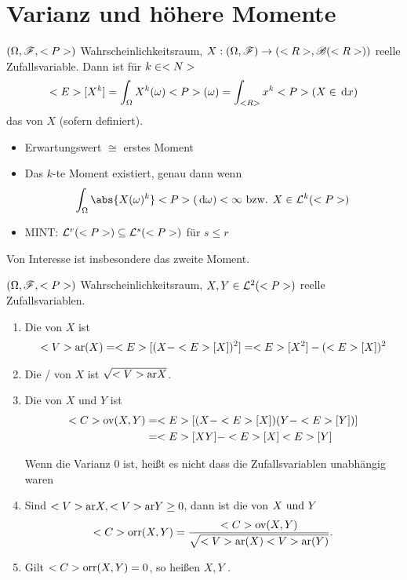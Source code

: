 \section{Varianz und höhere Momente}
\begin{definition}[$k$-te Momente]
	$(\Omega,\mathscr F,<P>)$ Wahrscheinlichkeitsraum, $X: (\Omega,\mathscr F) \to (<R>, \mathscr{B}(<R>))$ reelle Zufallsvariable. Dann ist für $k \in <N>$
	\begin{align*}
		<E>[X^k] = \int_{\Omega} X^k(\omega)<P>(\omega) = \int_{<R>}x^k <P>(X \in \,\mathrm{d} x)
	\end{align*}
	das  von $X$ (sofern definiert).
\end{definition}
\begin{*remark}
	\begin{itemize}
		\item Erwartungswert $\cong$ erstes Moment
		\item Das $k$-te Moment existiert, genau dann wenn
		\begin{align*}
			\int_{\O} \abs{X(\omega)^k}\P(\d \omega) < \infty \bzw X \in \Ln{k}(\P)
		\end{align*}
		\item MINT: $\mathcal{L}^{r}(<P>) \subseteq \mathcal{L}^{s}(<P>)$ für $s \le r$
	\end{itemize}
\end{*remark}
Von Interesse ist insbesondere das zweite Moment.
\begin{definition}
	$(\Omega,\mathscr F,<P>)$ Wahrscheinlichkeitsraum, $X,Y \in \mathcal{L}^{2}(<P>)$ reelle Zufallsvariablen.
	\begin{enumerate}
		\item Die  von $X$ ist
		\begin{align*}
			<V>\text{ar} (X) = <E>[(X - <E>[X])^2] = <E>[X^2] - (<E>[X])^2
		\end{align*}
		\item Die / von $X$ ist $\sqrt{<V>\text{ar} X}$.
		\item Die  von $X$ und $Y$ ist
		\begin{align*}
			<C>\text{ov}(X,Y) &= <E>[(X-<E>[X])(Y-<E>[Y])]\\
			&= <E>[XY] - <E>[X]<E>[Y]
		\end{align*}
		\begin{*hint}
			Wenn die Varianz 0 ist, heißt es nicht dass die Zufallsvariablen unabhängig waren
		\end{*hint}
		\item Sind $<V>\text{ar} X, <V>\text{ar} Y\ge 0$, dann ist die  von $X \text{ und } Y$
		\[
			<C>\text{orr}(X,Y) = \frac{<C>\text{ov}(X,Y)}{\sqrt{<V>\text{ar}(X)<V>\text{ar}(Y)}}.
		\] 
		\item Gilt $<C>\text{orr}(X,Y) =0$, so heißen $X,Y$ .
	\end{enumerate}
\end{definition}
